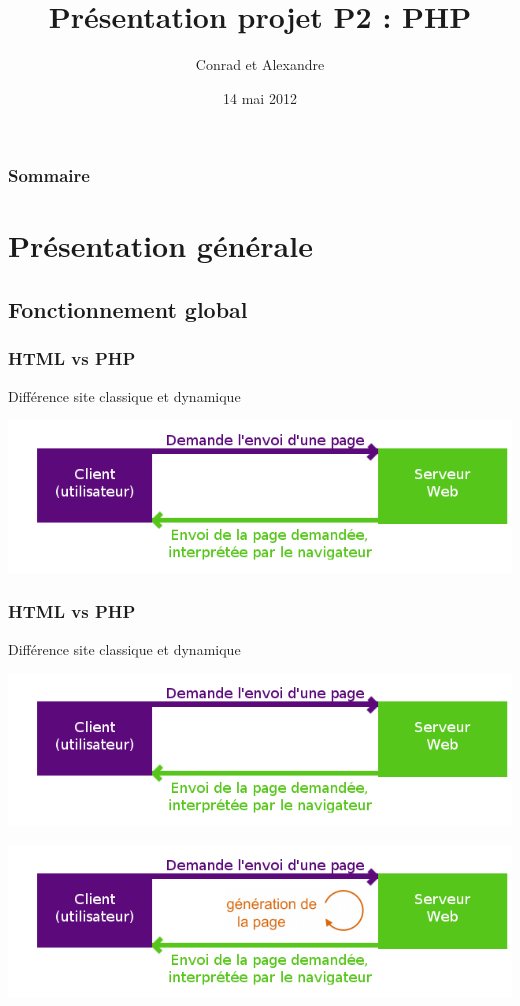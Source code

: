 \documentclass[handout]{beamer}
\title{Présentation projet P2 : PHP}
\author{Conrad \bsc{Hillairet} et Alexandre \bsc{Vieira}}
\institute{INSA de Rouen}
\date{14 mai 2012}
\begin{document}
\begin{frame}
\titlepage
\end{frame}

\begin{frame}
	\frametitle{Sommaire}
	\tableofcontents
\end{frame}

\section{Présentation générale}
\subsection[Fonction. global]{Fonctionnement global}
 
\begin{frame}
	\frametitle{HTML vs PHP}
	Différence site classique et dynamique\\
	\begin{center}
		\includegraphics[scale=0.4]{../dossier-HTML.png}

		\bigskip
	\end{center}
\end{frame}

\begin{frame}
	\frametitle{HTML vs PHP}
	Différence site classique et dynamique\\
	\begin{center}
		\includegraphics[scale=0.4]{../dossier-HTML.png}

		\bigskip
		\includegraphics[scale=0.4]{../dossier-PHP.png}
	\end{center}
\end{frame}
 
\end{document}
